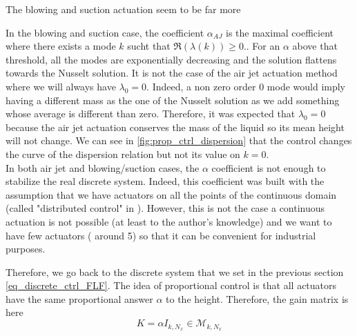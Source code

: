 \documentclass[12pt]{article}
\begin{document}
The blowing and suction actuation seem to be far more



In the blowing and suction case,  the coefficient $\alpha_{AJ}$ is the maximal coefficient where there exists a mode $k$ sucht that $\mathfrak{R}(\lambda(k)) \geq 0.$. For an $\alpha$ above that threshold, all the modes are exponentially decreasing and the solution flattens towards the Nusselt solution. It is not the case of the air jet actuation method where we will always have $\lambda_0=0.$ Indeed, a non zero order 0 mode would imply having a different mass as the one of the Nusselt solution as we add something whose average is different than zero. Therefore, it was expected that $\lambda_0 = 0$ because the air jet actuation conserves the mass of the liquid so its mean height will not change. We can see in \eqref{fig:prop_ctrl_dispersion} that the control changes the curve of the dispersion relation but not its value on $k=0$.
\\

In both air jet and blowing/suction cases, the $\alpha$ coefficient is not enough to stabilize the real discrete system. Indeed, this coefficient was built with the assumption that we have actuators on all the points of the continuous domain (called "distributed control" in \cite{Thompson_2016_prop_ctrl}). However, this is not the case a continuous actuation is not possible (at least to the author's knowledge) and we want to have few actuators ( around 5) so that it can be convenient for industrial purposes. 

Therefore, we go back to the discrete system that we set in the previous section \eqref{eq_discrete_ctrl_FLF}. The idea of proportional control is that all actuators have the same proportional answer $\alpha$ to the height. Therefore, the gain matrix is here 
\begin{equation}
    K = \alpha I_{k, N_x} \in \mathcal{M}_{k,N_x}
\end{equation}
\end{document}
